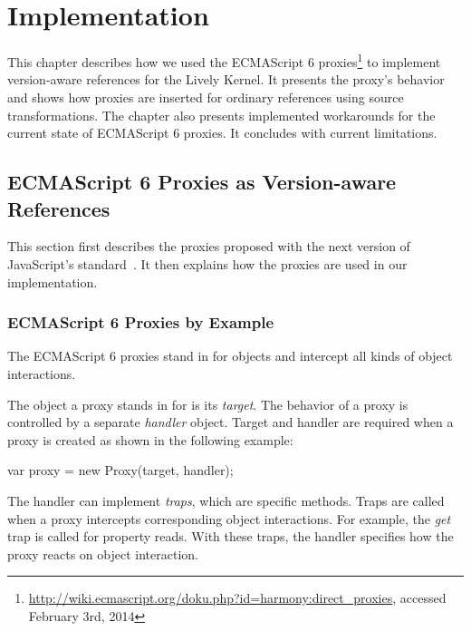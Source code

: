 

\chapter{Implementation} \label{chapter:IMPLEMENTATION}

This chapter describes how we used the ECMAScript 6 proxies\footnote{\url{http://wiki.ecmascript.org/doku.php?id=harmony:direct_proxies}, accessed February 3rd, 2014} to implement version-aware references for the Lively Kernel.
It presents the proxy's behavior and shows how proxies are inserted for ordinary references using source transformations.
The chapter also presents implemented workarounds for the current state of ECMAScript 6 proxies.
It concludes with current limitations.


\section{ECMAScript 6 Proxies as Version-aware References} \label{sec:IMPLEMENTATION:1}

This section first describes the proxies proposed with the next version of JavaScript's standard~\cite{Ecma2014ES6}.
It then explains how the proxies are used in our implementation.

\subsection{ECMAScript 6 Proxies by Example}

The ECMAScript 6 proxies stand in for objects and intercept all kinds of object interactions.

The object a proxy stands in for is its \emph{target}.
The behavior of a proxy is controlled by a separate \emph{handler} object.
Target and handler are required when a proxy is created as shown in the following example:

\begin{code}{}{}
var proxy = new Proxy(target, handler);
\end{code}
\label{lst:example}
\iffalse
\end{verbatim}\fi

The handler can implement \emph{traps}, which are specific methods.
Traps are called when a proxy intercepts corresponding object interactions.
For example, the \emph{get} trap is called for property reads.
With these traps, the handler specifies how the proxy reacts on object interaction.

